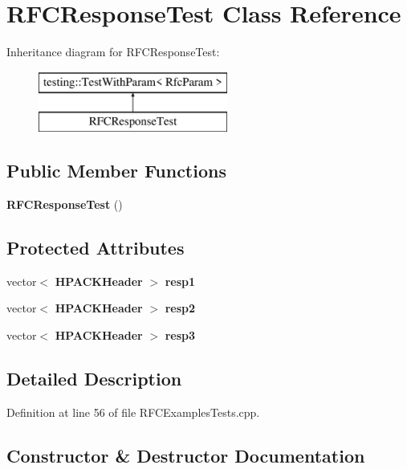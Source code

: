 \section{R\+F\+C\+Response\+Test Class Reference}
\label{classRFCResponseTest}
Inheritance diagram for R\+F\+C\+Response\+Test\+:\begin{figure}[H]
\begin{center}
\leavevmode
\includegraphics[height=2.000000cm]{classRFCResponseTest}
\end{center}
\end{figure}
\subsection*{Public Member Functions}
\begin{DoxyCompactItemize}
\item 
{\bf R\+F\+C\+Response\+Test} ()
\end{DoxyCompactItemize}
\subsection*{Protected Attributes}
\begin{DoxyCompactItemize}
\item 
vector$<$ {\bf H\+P\+A\+C\+K\+Header} $>$ {\bf resp1}
\item 
vector$<$ {\bf H\+P\+A\+C\+K\+Header} $>$ {\bf resp2}
\item 
vector$<$ {\bf H\+P\+A\+C\+K\+Header} $>$ {\bf resp3}
\end{DoxyCompactItemize}


\subsection{Detailed Description}


Definition at line 56 of file R\+F\+C\+Examples\+Tests.\+cpp.



\subsection{Constructor \& Destructor Documentation}
